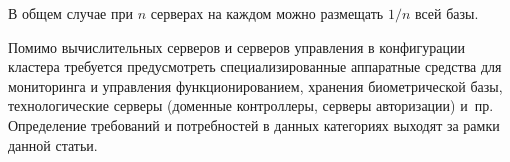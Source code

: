      \begin{multicols}{2}
     
\noindent
В общем случае при $n$ 
серверах на каждом можно размещать $1/n$ всей базы. 

          Помимо вычислительных серверов и сер\-веров управления в конфигурации 
кластера требуется предусмотреть специализированные аппаратные средства для 
мониторинга и управления функционированием, хранения биометрической базы, 
технологические серверы (доменные контроллеры, серверы авторизации) и~пр. 
Определение требований и потребностей в данных категориях выходят за рамки данной 
статьи. 

\begin{table*}\small %
\begin{center}
\vspace*{2ex}


\end{center}
\end{table*}
\end{multicols}
